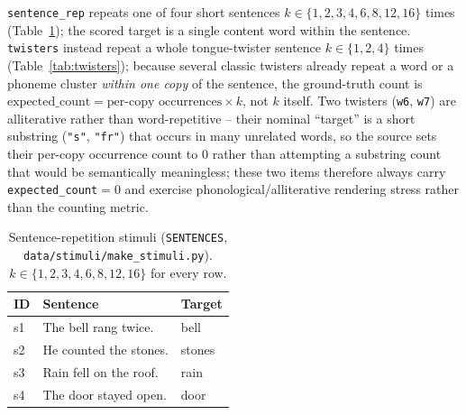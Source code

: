 \documentclass[11pt]{article}
\begin{document}
\texttt{sentence\_rep} repeats one of four short sentences $k\in\{1,2,3,4,6,8,12,16\}$
times (Table~\ref{tab:sentences}); the scored target is a single content word
within the sentence. \texttt{twisters} instead repeat a whole tongue-twister
sentence $k\in\{1,2,4\}$ times (Table~\ref{tab:twisters}); because several
classic twisters already repeat a word or a phoneme cluster \emph{within one
copy} of the sentence, the ground-truth count is
$\text{expected\_count} = \text{per-copy occurrences} \times k$, not $k$
itself. Two twisters (\texttt{w6}, \texttt{w7}) are alliterative rather than
word-repetitive -- their nominal ``target'' is a short substring
(\texttt{"s"}, \texttt{"fr"}) that occurs in many unrelated words, so the
source sets their per-copy occurrence count to $0$ rather than attempting a
substring count that would be semantically meaningless; these two items
therefore always carry \texttt{expected\_count}$=0$ and exercise
phonological/alliterative rendering stress rather than the counting metric.

\begin{table}[h]
\centering
\caption{Sentence-repetition stimuli (\texttt{SENTENCES},
\texttt{data/stimuli/make\_stimuli.py}). $k \in \{1,2,3,4,6,8,12,16\}$ for
every row.}
\label{tab:sentences}
\begin{tabular}{@{}lll@{}}
\toprule
ID & Sentence & Target \\
\midrule
s1 & The bell rang twice. & bell \\
s2 & He counted the stones. & stones \\
s3 & Rain fell on the roof. & rain \\
s4 & The door stayed open. & door \\
\bottomrule
\end{tabular}
\end{table}
\end{document}
